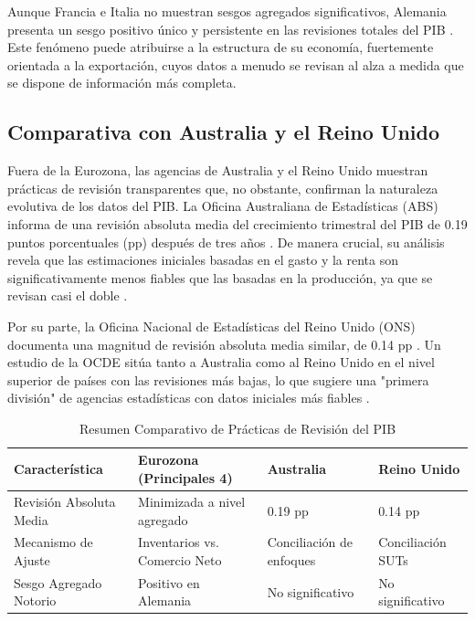 \documentclass{article}
\begin{document}
Aunque Francia e Italia no muestran sesgos agregados significativos, Alemania presenta un sesgo positivo único y persistente en las revisiones totales del PIB \cite{bce_wp_2857}. Este fenómeno puede atribuirse a la estructura de su economía, fuertemente orientada a la exportación, cuyos datos a menudo se revisan al alza a medida que se dispone de información más completa.

\subsection*{Comparativa con Australia y el Reino Unido}
Fuera de la Eurozona, las agencias de Australia y el Reino Unido muestran prácticas de revisión transparentes que, no obstante, confirman la naturaleza evolutiva de los datos del PIB. La Oficina Australiana de Estadísticas (ABS) informa de una revisión absoluta media del crecimiento trimestral del PIB de 0.19 puntos porcentuales (pp) después de tres años \cite{abs_revisions}. De manera crucial, su análisis revela que las estimaciones iniciales basadas en el gasto y la renta son significativamente menos fiables que las basadas en la producción, ya que se revisan casi el doble \cite{abs_revisions}.

Por su parte, la Oficina Nacional de Estadísticas del Reino Unido (ONS) documenta una magnitud de revisión absoluta media similar, de 0.14 pp \cite{ons_bluebook_2022}. Un estudio de la OCDE sitúa tanto a Australia como al Reino Unido en el nivel superior de países con las revisiones más bajas, lo que sugiere una "primera división" de agencias estadísticas con datos iniciales más fiables \cite{oecd_revisions}.

\begin{table}[h!]
\centering
\caption{Resumen Comparativo de Prácticas de Revisión del PIB}
\label{tab:revision_summary}
\begin{tabular}{llll}
\toprule
\textbf{Característica} & \textbf{Eurozona (Principales 4)} & \textbf{Australia} & \textbf{Reino Unido} \\
\midrule
Revisión Absoluta Media & Minimizada a nivel agregado & 0.19 pp & 0.14 pp \\
Mecanismo de Ajuste & Inventarios vs. Comercio Neto & Conciliación de enfoques & Conciliación SUTs \\
Sesgo Agregado Notorio & Positivo en Alemania & No significativo & No significativo \\
\bottomrule
\end{tabular}
\end{table}
\end{document}
